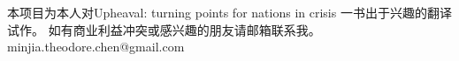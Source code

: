


本项目为本人对Upheaval: turning points for nations in crisis\cite{mionel2022upheaval} 一书出于兴趣的翻译试作。 如有商业利益冲突或感兴趣的朋友请邮箱联系我。minjia.theodore.chen@gmail.com




